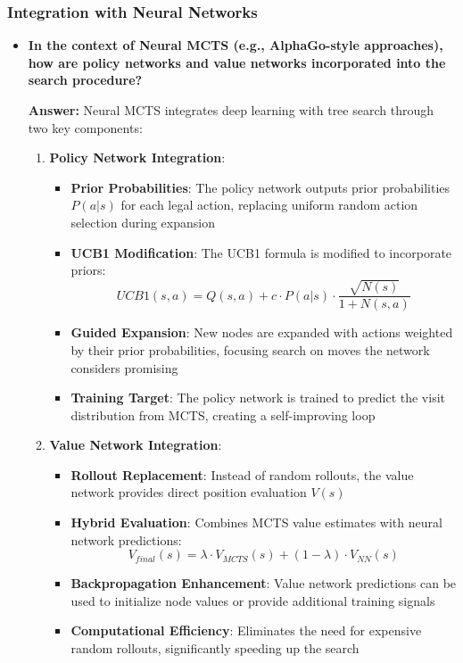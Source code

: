 \subsubsection{Integration with Neural Networks}
\begin{itemize}
    \item \textbf{In the context of Neural MCTS (e.g., AlphaGo-style approaches), how are policy networks and value networks incorporated into the search procedure?}
    
    \textbf{Answer:} Neural MCTS integrates deep learning with tree search through two key components:
    
    \begin{enumerate}
        \item \textbf{Policy Network Integration}:
        \begin{itemize}
            \item \textbf{Prior Probabilities}: The policy network outputs prior probabilities $P(a|s)$ for each legal action, replacing uniform random action selection during expansion
            \item \textbf{UCB1 Modification}: The UCB1 formula is modified to incorporate priors:
            \[UCB1(s,a) = Q(s,a) + c \cdot P(a|s) \cdot \frac{\sqrt{N(s)}}{1 + N(s,a)}\]
            \item \textbf{Guided Expansion}: New nodes are expanded with actions weighted by their prior probabilities, focusing search on moves the network considers promising
            \item \textbf{Training Target}: The policy network is trained to predict the visit distribution from MCTS, creating a self-improving loop
        \end{itemize}
        
        \item \textbf{Value Network Integration}:
        \begin{itemize}
            \item \textbf{Rollout Replacement}: Instead of random rollouts, the value network provides direct position evaluation $V(s)$
            \item \textbf{Hybrid Evaluation}: Combines MCTS value estimates with neural network predictions:
            \[V_{final}(s) = \lambda \cdot V_{MCTS}(s) + (1-\lambda) \cdot V_{NN}(s)\]
            \item \textbf{Backpropagation Enhancement}: Value network predictions can be used to initialize node values or provide additional training signals
            \item \textbf{Computational Efficiency}: Eliminates the need for expensive random rollouts, significantly speeding up the search
        \end{itemize}
        

\end{enumerate}
\end{itemize}
